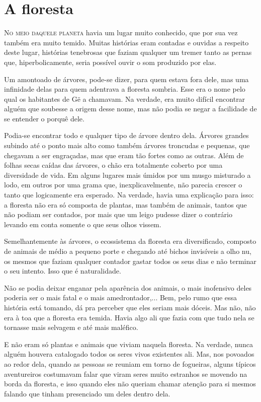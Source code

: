 

\chapter{A floresta}
\lettrine{N}{o meio daquele planeta} havia um lugar muito conhecido, que por sua vez também era muito temido. Muitas histórias eram contadas e ouvidas a respeito deste lugar, histórias tenebrosas que faziam qualquer um tremer tanto as pernas que, hiperbolicamente, seria possível ouvir o som produzido por elas.

Um amontoado de árvores, pode-se dizer, para quem estava fora dele, mas uma infinidade delas para quem adentrava a floresta sombria. Esse era o nome pelo qual os habitantes de Gë a chamavam. Na verdade, era muito difícil encontrar alguém que soubesse a origem desse nome, mas não podia se negar a facilidade de se entender o porquê dele.

Podia-se encontrar todo e qualquer tipo de árvore dentro dela. Árvores grandes subindo até o ponto mais alto como também árvores troncudas e pequenas, que chegavam a ser engraçadas, mas que eram tão fortes como as outras. Além de folhas secas caídas das árvores, o chão era totalmente coberto por uma diversidade de vida. Em alguns lugares mais úmidos por um musgo misturado a lodo, em outros por uma grama que, inexplicavelmente, não parecia crescer o tanto que logicamente era esperado. Na verdade, havia uma explicação para isso: a floresta não era só composta de plantas, mas também de animais, tantos que não podiam ser contados, por mais que um leigo pudesse dizer o contrário levando em conta somente o que seus olhos vissem.

Semelhantemente às árvores, o ecossistema da floresta era diversificado, composto de animais de médio a pequeno porte e chegando até bichos invisíveis a olho nu, os mesmos que faziam qualquer contador gastar todos os seus dias e não terminar o seu intento. Isso que é naturalidade. 

Não se podia deixar enganar pela aparência dos animais, o mais inofensivo deles poderia ser o mais fatal e o mais amedrontador,... Bem, pelo rumo que essa história está tomando, dá pra perceber que eles seriam mais dóceis. Mas não, não era à toa que a floresta era temida. Havia algo ali que fazia com que tudo nela se tornasse mais selvagem e até mais maléfico.

E não eram só plantas e animais que viviam naquela floresta. Na verdade, nunca alguém houvera catalogado todos os seres vivos existentes ali. Mas, nos povoados ao redor dela, quando as pessoas se reuniam em torno de fogueiras, alguns típicos aventureiros costumavam falar que viram seres muito estranhos se movendo na borda da floresta, e isso quando eles não queriam chamar atenção para si mesmos falando que tinham presenciado um deles dentro dela.
